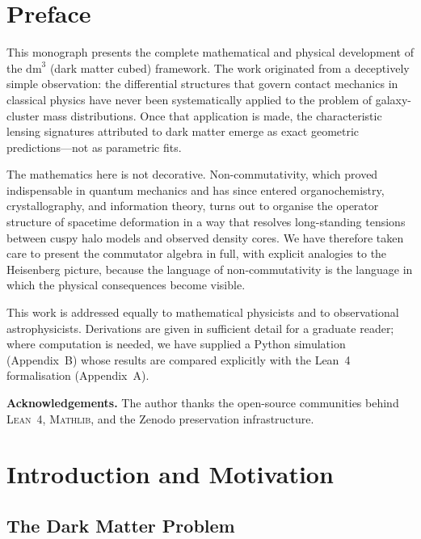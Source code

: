 \documentclass[11pt,a4paper,openright]{book}
\theoremstyle{dm3thm}
\theoremstyle{dm3def}
\newcommand{\dm}{\mathrm{dm}^3}
\begin{document}
\chapter*{Preface}

This monograph presents the complete mathematical and physical development of the
$\dm$ (dark matter cubed) framework.  The work originated from a deceptively
simple observation: the differential structures that govern contact mechanics in
classical physics have never been systematically applied to the problem of
galaxy-cluster mass distributions.  Once that application is made, the
characteristic lensing signatures attributed to dark matter emerge as exact
geometric predictions---not as parametric fits.

The mathematics here is not decorative.  Non-commutativity, which proved
indispensable in quantum mechanics and has since entered organochemistry,
crystallography, and information theory, turns out to organise the operator
structure of spacetime deformation in a way that resolves long-standing
tensions between cuspy halo models and observed density cores.  We have
therefore taken care to present the commutator algebra in full, with explicit
analogies to the Heisenberg picture, because the language of non-commutativity
is the language in which the physical consequences become visible.

This work is addressed equally to mathematical physicists and to observational
astrophysicists.  Derivations are given in sufficient detail for a graduate
reader; where computation is needed, we have supplied a Python simulation
(Appendix~B) whose results are compared explicitly with the Lean~4 formalisation
(Appendix~A).

\medskip
\noindent
\textbf{Acknowledgements.}\quad
The author thanks the open-source communities behind \textsc{Lean~4},
\textsc{Mathlib}, and the Zenodo preservation infrastructure.

\mainmatter

\chapter{Introduction and Motivation}
\label{ch:intro}

\section{The Dark Matter Problem}
\end{document}
